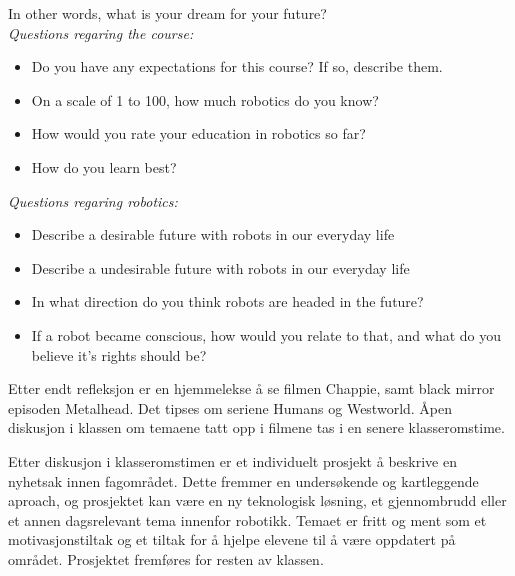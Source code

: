 \begin{itemize}
\begin{itemize}
            \end{itemize}
            In other words, what is your dream for your future?\\

            \emph{Questions regaring the course:}
            \begin{itemize}

                \item Do you have any expectations for this course? If so, describe them.
                \item On a scale of 1 to 100, how much robotics do you know?
                \item How would you rate your education in robotics so far?
                \item How do you learn best?

            \end{itemize}

            \emph{Questions regaring robotics:}
            \begin{itemize}

                \item Describe a desirable future with robots in our everyday life
                \item Describe a undesirable future with robots in our everyday life
                \item In what direction do you think robots are headed in the future?
                \item If a robot became conscious, how would you relate to that, and what do you believe it's rights should be?

            \end{itemize}
        Etter endt refleksjon er en hjemmelekse å se filmen Chappie, samt black mirror episoden Metalhead. Det tipses om seriene Humans og Westworld. Åpen diskusjon i klassen om temaene tatt opp i filmene tas i en senere klasseromstime.

        Etter diskusjon i klasseromstimen er et individuelt prosjekt å beskrive en nyhetsak innen fagområdet. Dette fremmer en undersøkende og kartleggende aproach, og prosjektet kan være en ny teknologisk løsning, et gjennombrudd eller et annen dagsrelevant tema innenfor robotikk. Temaet er fritt og ment som et motivasjonstiltak og et tiltak for å hjelpe elevene til å være oppdatert på området. Prosjektet fremføres for resten av klassen.

    \end{itemize}
